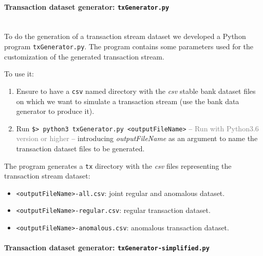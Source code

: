 \paragraph{Transaction dataset generator: \texttt{txGenerator.py} \\\\}

To do the generation of a transaction stream dataset we developed a Python program \texttt{txGenerator.py}. The program contains some parameters used for the customization of the generated transaction stream. 

To use it:

\begin{enumerate}
    \item Ensure to have a \texttt{csv} named directory with the \emph{csv} stable bank dataset files on which we want to simulate a transaction stream (use the bank data generator to produce it).
    \item Run \texttt{\$> python3 txGenerator.py <outputFileName>} -- \textcolor{gray}{Run with Python3.6 version or higher} -- introducing \emph{outputFileName} as an argument to name the transaction dataset files to be generated.
\end{enumerate}

The program generates a \texttt{tx} directory with the \emph{csv} files representing the transaction stream dataset:

\begin{itemize}
    \item \texttt{<outputFileName>-all.csv}: joint regular and anomalous dataset.
    \item \texttt{<outputFileName>-regular.csv}: regular transaction dataset.
    \item \texttt{<outputFileName>-anomalous.csv}: anomalous transaction dataset.
\end{itemize}


\paragraph{Transaction dataset generator: \texttt{txGenerator-simplified.py} \\\\}

